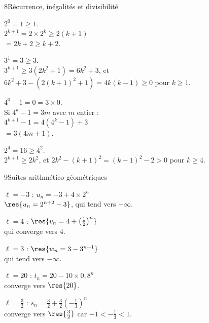 \begin{deuxcolonnes}
\begin{corrige}{8}{Récurrence, inégalités et divisibilité}
\begin{questions}
  \item {} $2^{0}=1\geq1$.\\
     $2^{k+1}=2\times2^{k}\geq2(k+1)$\\ $=2k+2\geq k+2$.
  \item {} $3^{1}=3\geq3$.\\
     $3^{k+1}\geq3\left(2k^{2}+1\right)=6k^{2}+3$, et
    $6k^{2}+3-\left(2(k+1)^{2}+1\right)=4k(k-1)\geq0$ pour $k\geq1$.
  \item {} $4^{0}-1=0=3\times0$.\\
     Si $4^{k}-1=3m$ avec $m$ entier :\\
    $4^{k+1}-1=4\left(4^{k}-1\right)+3$\\ $=3(4m+1)$.
  \item {} $2^{4}=16\geq4^{2}$.\\
     $2^{k+1}\geq2k^{2}$, et $2k^{2}-(k+1)^{2}=(k-1)^{2}-2>0$ pour $k\geq4$.
\end{questions}
\end{corrige}

\begin{corrige}{9}{Suites arithmético-géométriques}
\begin{questions}
  \item $\ell=-3$ : $u_n=-3+4\times2^{n}$\\
    $\res{u_n=2^{n+2}-3}$, qui tend vers $+\infty$.
  \item $\ell=4$ : $\res{v_n=4+\left(\frac12\right)^{n}}$\\ qui converge vers $4$.
  \item $\ell=3$ : $\res{w_n=3-3^{n+1}}$\\ qui tend vers $-\infty$.
  \item $\ell=20$ : $t_n=20-10\times0{,}8^{n}$\\ converge vers $\res{20}$.
  \item $\ell=\frac32$ : $s_n=\frac32+\frac32\left(-\frac13\right)^{n}$\\
    converge vers $\res{\frac{3}{2}}$ car $-1<-\frac13<1$.
\end{questions}
\end{corrige}

\end{deuxcolonnes}

